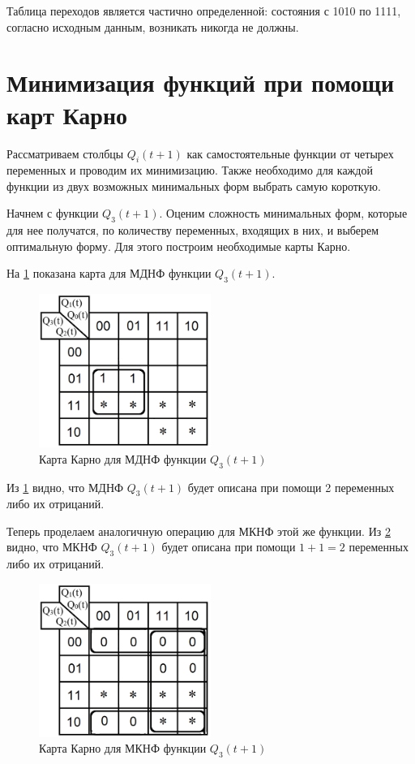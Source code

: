 \documentclass[14pt, a4paper]{extreport}
\begin{document}
Таблица переходов является частично определенной: состояния с 1010 по 1111, согласно исходным данным, возникать никогда не должны.

\section{Минимизация функций при помощи карт Карно}
Рассматриваем столбцы $Q_i(t + 1)$ как самостоятельные функции от четырех переменных и проводим их минимизацию. Также необходимо для каждой функции из двух возможных минимальных форм выбрать самую короткую.

Начнем с функции $Q_3(t + 1)$. Оценим сложность минимальных форм, которые для нее получатся, по количеству переменных, входящих в них, и выберем оптимальную форму. Для этого построим необходимые карты Карно.

На \cref{fig:map-mdnf-q3} показана карта для МДНФ функции $Q_3(t + 1)$.

\begin{figure}[H]
	\caption{Карта Карно для МДНФ функции $Q_3(t + 1)$}
	\label{fig:map-mdnf-q3}
	\includegraphics[width=0.5\textwidth]{map-mdnf-q3-selected}
\end{figure}

Из \cref{fig:map-mdnf-q3} видно, что МДНФ $Q_3(t + 1)$ будет описана при помощи 2 переменных либо их отрицаний.

Теперь проделаем аналогичную операцию для МКНФ этой же функции. Из \cref{fig:map-mknf-q3} видно, что МКНФ $Q_3(t + 1)$ будет описана при помощи $1 + 1 = 2$ переменных либо их отрицаний.

\begin{figure}[H]
	\caption{Карта Карно для МКНФ функции $Q_3(t + 1)$}
	\label{fig:map-mknf-q3}
	\includegraphics[width=0.5\textwidth]{map-mknf-q3-selected}
\end{figure}
\end{document}
